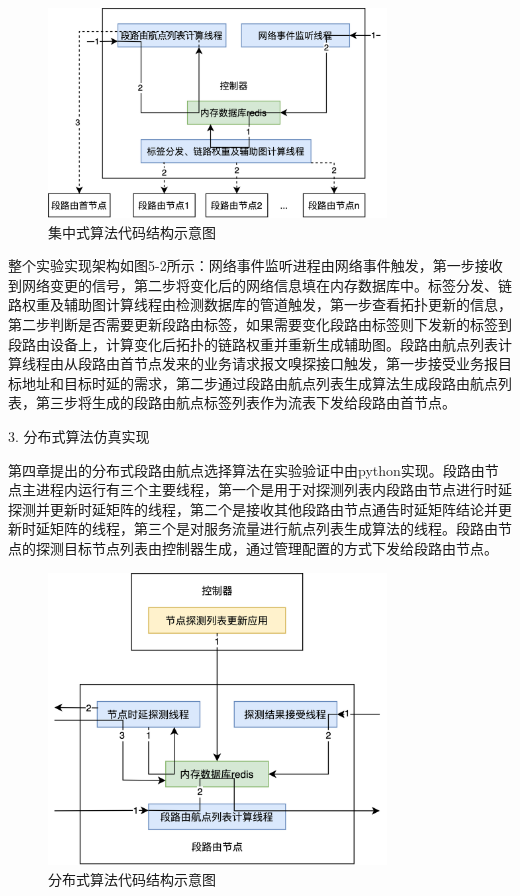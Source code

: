 \begin{figure}[htbp]
\setlength{\abovecaptionskip}{15pt plus 3pt minus 2pt}
\centerline{\includegraphics[width=0.8\textwidth]{./figures/ch3-test-code.png}}
\caption{集中式算法代码结构示意图}
\label{fig-ch3-test-code}
\end{figure}

整个实验实现架构如图5-2所示：网络事件监听进程由网络事件触发，第一步接收到网络变更的信号，第二步将变化后的网络信息填在内存数据库中。标签分发、链路权重及辅助图计算线程由检测数据库的管道触发，第一步查看拓扑更新的信息，第二步判断是否需要更新段路由标签，如果需要变化段路由标签则下发新的标签到段路由设备上，计算变化后拓扑的链路权重并重新生成辅助图。段路由航点列表计算线程由从段路由首节点发来的业务请求报文嗅探接口触发，第一步接受业务报目标地址和目标时延的需求，第二步通过段路由航点列表生成算法生成段路由航点列表，第三步将生成的段路由航点标签列表作为流表下发给段路由首节点。

3. 分布式算法仿真实现

第四章提出的分布式段路由航点选择算法在实验验证中由python实现。段路由节点主进程内运行有三个主要线程，第一个是用于对探测列表内段路由节点进行时延探测并更新时延矩阵的线程，第二个是接收其他段路由节点通告时延矩阵结论并更新时延矩阵的线程，第三个是对服务流量进行航点列表生成算法的线程。段路由节点的探测目标节点列表由控制器生成，通过管理配置的方式下发给段路由节点。

\begin{figure}[htbp]
\setlength{\abovecaptionskip}{15pt plus 3pt minus 2pt}
\centerline{\includegraphics[width=0.8\textwidth]{./figures/ch4-test-code.png}}
\caption{分布式算法代码结构示意图}
\label{fig-ch4-test-code}
\end{figure}

